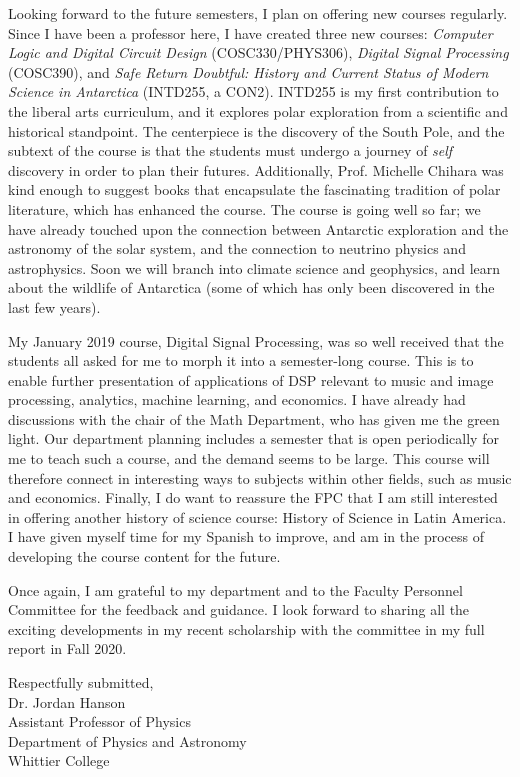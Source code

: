 \documentclass[../../main.tex]{subfiles}
\begin{document}
Looking forward to the future semesters, I plan on offering new courses regularly.  Since I have been a professor here, I have created three new courses: \textit{Computer Logic and Digital Circuit Design} (COSC330/PHYS306), \textit{Digital Signal Processing} (COSC390), and \textit{Safe Return Doubtful: History and Current Status of Modern Science in Antarctica} (INTD255, a CON2).  INTD255 is my first contribution to the liberal arts curriculum, and it explores polar exploration from a scientific and historical standpoint.  The centerpiece is the discovery of the South Pole, and the subtext of the course is that the students must undergo a journey of \textit{self} discovery in order to plan their futures.  Additionally, Prof. Michelle Chihara was kind enough to suggest books that encapsulate the fascinating tradition of polar literature, which has enhanced the course.  The course is going well so far; we have already touched upon the connection between Antarctic exploration and the astronomy of the solar system, and the connection to neutrino physics and astrophysics. Soon we will branch into climate science and geophysics, and learn about the wildlife of Antarctica (some of which has only been discovered in the last few years).  \\ \hspace{0.1cm}

My January 2019 course, Digital Signal Processing, was so well received that the students all asked for me to morph it into a semester-long course.  This is to enable further presentation of applications of DSP relevant to music and image processing, analytics, machine learning, and economics.  I have already had discussions with the chair of the Math Department, who has given me the green light.  Our department planning includes a semester that is open periodically for me to teach such a course, and the demand seems to be large.  This course will therefore connect in interesting ways to subjects within other fields, such as music and economics.  Finally, I do want to reassure the FPC that I am still interested in offering another history of science course: History of Science in Latin America.  I have given myself time for my Spanish to improve, and am in the process of developing the course content for the future. \\ \hspace{0.1cm}

Once again, I am grateful to my department and to the Faculty Personnel Committee for the feedback and guidance.  I look forward to sharing all the exciting developments in my recent scholarship with the committee in my full report in Fall 2020. \\ \hspace{0.1cm}

Respectfully submitted, \\
Dr. Jordan Hanson\\
Assistant Professor of Physics\\
Department of Physics and Astronomy\\
Whittier College
\end{document}
